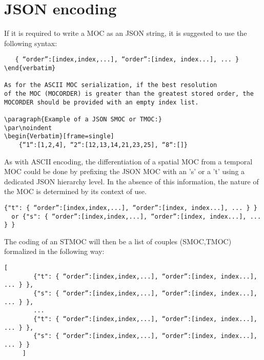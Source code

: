 \section{JSON encoding}
If it is required to write a MOC as an JSON string,
it is suggested to use the following syntax:

\par\noindent
\begin{Verbatim}
   { “order”:[index,index,...], “order”:[index, index...], ... }
\end{verbatim}

As for the ASCII MOC serialization, if the best resolution
of the MOC (MOCORDER) is greater than the greatest stored order, the
MOCORDER should be provided with an empty index list.

\paragraph{Example of a JSON SMOC or TMOC:}
\par\noindent
\begin{Verbatim}[frame=single]
    {“1“:[1,2,4], “2“:[12,13,14,21,23,25], “8“:[]}
\end{Verbatim}

As with ASCII encoding, the differentiation of a spatial MOC from a temporal MOC could be done by prefixing the JSON MOC with an 's' or a 't' using a dedicated JSON hierarchy level. In the absence of this information, the nature of the MOC is determined by its context of use.

\par\noindent
\begin{Verbatim}[frame=single, xrightmargin=-3cm] 
     {"t": { “order”:[index,index,...], “order”:[index, index...], ... } }
  or {"s": { “order”:[index,index,...], “order”:[index, index...], ... } }
\end{Verbatim}


The coding of an STMOC will then be a list of couples (SMOC,TMOC) formalized in the following way:
\par\noindent
\begin{Verbatim}[frame=single, xrightmargin=-3cm] 
     [
        {"t": { “order”:[index,index,...], “order”:[index, index...], ... } },
        {"s": { “order”:[index,index,...], “order”:[index, index...], ... } },
        ...
        {"t": { “order”:[index,index,...], “order”:[index, index...], ... } },
        {"s": { “order”:[index,index,...], “order”:[index, index...], ... } }
     ]
\end{Verbatim}

